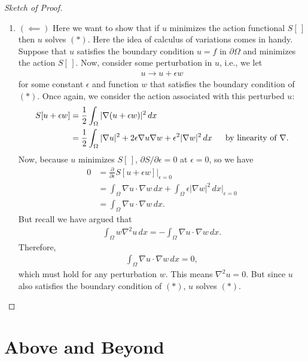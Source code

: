 \documentclass{article}
\newcommand{\p}{\partial}
\newcommand{\f}[2]{\frac{#1}{#2}}
\begin{document}
\begin{proof}[Sketch of Proof]
\begin{enumerate}
		   
		\item $(\impliedby)$ Here we want to show that if $u$ minimizes the action functional $S[\,]$ then $u$ solves $(\ast)$. Here the idea of calculus of variations comes in handy. Suppose that $u$ satisfies the boundary condition $u=f$ in $\p\Omega$ and minimizes the action $S[\,]$. Now, consider some perturbation in $u$, i.e., we let
		\begin{align}
		u \to u + \epsilon w
		\end{align}
		for some constant $\epsilon$ and function $w$ that satisfies the boundary condition of $(\ast)$. Once again, we consider the action associated with this perturbed $u$:
		\begin{align}
		S[u + \epsilon w] &= \frac{1}{2}\int_\Omega \vert \nabla (u + \epsilon w)\vert^2\,dx \nonumber\\
		&= \f{1}{2}\int_\Omega \vert \nabla u \vert^2 + 2\epsilon \nabla u \nabla w + \epsilon^2\vert \nabla w \vert^2\,dx\,\hspace{0.5cm}\text{by linearity of $\nabla$}.
		\end{align} 
		Now, because $u$ minimizes $S[\,]$, ${\p S}/{\p \epsilon} = 0 $ at $\epsilon = 0$, so we have
		\begin{align}
		0 
		&= \f{\p}{\p \epsilon}S[u+\epsilon w]\bigg\vert_{\epsilon =0}\nonumber\\
		&= \int_\Omega \nabla u \cdot \nabla w \,dx + \int_\Omega \epsilon \vert \nabla w \vert^2\,dx \bigg\vert_{\epsilon=0}\nonumber\\
		&= \int_{\Omega}\nabla u \cdot \nabla w\,dx.
		\end{align}
		But recall we have argued that 
		\begin{align*}
		\int_\Omega w\nabla^2u\,dx = -\int_\Omega \nabla u  \cdot \nabla w\,dx.
		\end{align*}
		Therefore,
		\begin{align}
		\int_\Omega \nabla u\cdot \nabla w\,dx = 0,
		\end{align}
		which must hold for any perturbation $w$. This means $\nabla^2u = 0$. But since $u$ also satisfies the boundary condition of $(\ast)$, $u$ solves $(\ast)$. 
	\end{enumerate}
\end{proof} 


\section{Above and Beyond}
\end{document}
